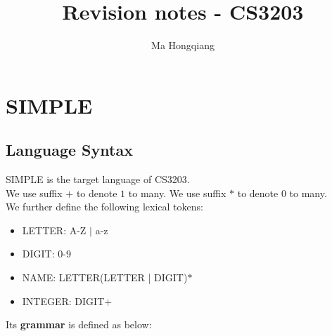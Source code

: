 \documentclass[12pt]{article}
\theoremstyle{definition}
\begin{document}
\title{Revision notes - CS3203}
\author{Ma Hongqiang}
\maketitle
\tableofcontents

\clearpage
\section{SIMPLE}
\subsection{Language Syntax}
\textsc{SIMPLE} is the target language of CS3203. \\
We use suffix $+$ to denote $1$ to many. We use suffix $*$ to denote $0$ to many.\\
We further define the following lexical tokens:
\begin{itemize}
	\item LETTER: A-Z $|$ a-z
	\item DIGIT: 0-9
	\item NAME: LETTER(LETTER | DIGIT)$*$
	\item INTEGER: DIGIT$+$
\end{itemize}
Its \textbf{grammar} is defined as below:
\end{document}
